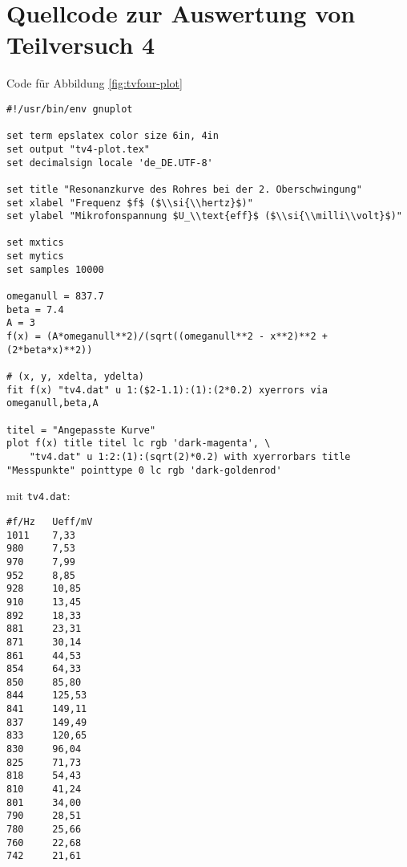 \section{\gnuplot{} Quellcode zur Auswertung von Teilversuch 4}
    \label{appdx:gnuplotTV4}

    \gnuplot{} Code für Abbildung \ref{fig:tvfour-plot}
    {  
        \renewcommand{\fcolorbox}[4][]{#4}
        \begin{verbatim}
#!/usr/bin/env gnuplot

set term epslatex color size 6in, 4in
set output "tv4-plot.tex"
set decimalsign locale 'de_DE.UTF-8'

set title "Resonanzkurve des Rohres bei der 2. Oberschwingung"
set xlabel "Frequenz $f$ ($\\si{\\hertz}$)"
set ylabel "Mikrofonspannung $U_\\text{eff}$ ($\\si{\\milli\\volt}$)"

set mxtics
set mytics
set samples 10000

omeganull = 837.7
beta = 7.4
A = 3
f(x) = (A*omeganull**2)/(sqrt((omeganull**2 - x**2)**2 + (2*beta*x)**2))

# (x, y, xdelta, ydelta)
fit f(x) "tv4.dat" u 1:($2-1.1):(1):(2*0.2) xyerrors via omeganull,beta,A

titel = "Angepasste Kurve"
plot f(x) title titel lc rgb 'dark-magenta', \
    "tv4.dat" u 1:2:(1):(sqrt(2)*0.2) with xyerrorbars title "Messpunkte" pointtype 0 lc rgb 'dark-goldenrod'
        \end{verbatim}
    }
    mit \texttt{tv4.dat}:
    \begin{multicols}{3}
        \begin{verbatim}
#f/Hz   Ueff/mV
1011    7,33
980     7,53
970     7,99
952     8,85
928     10,85
910     13,45
892     18,33
881     23,31
871     30,14
861     44,53
854     64,33
850     85,80
844     125,53
841     149,11
837     149,49
833     120,65
830     96,04
825     71,73
818     54,43
810     41,24
801     34,00
790     28,51
780     25,66
760     22,68
742     21,61
        \end{verbatim}
    \end{multicols}
